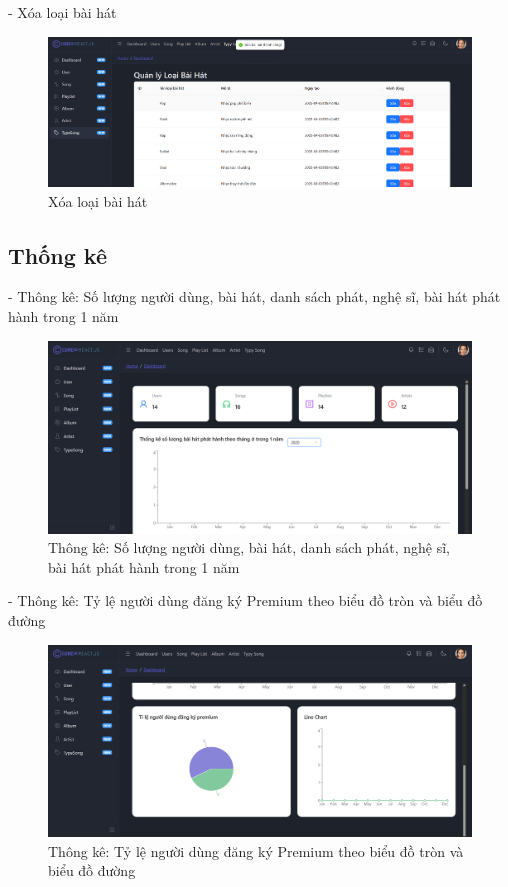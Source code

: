 - Xóa loại bài hát
\begin{figure}[H]
    \centering
    \includegraphics[width=1\textwidth]{imgs/chap5/ql_loai_bai_hat_4.png}
    \caption{Xóa loại bài hát}
\end{figure}

\subsection{Thống kê}
- Thông kê: Số lượng người dùng, bài hát, danh sách phát, nghệ sĩ, bài hát phát hành trong 1 năm
\begin{figure}[H]
    \centering
    \includegraphics[width=1\textwidth]{imgs/chap5/thongke_1.png}
    \caption{Thông kê: Số lượng người dùng, bài hát, danh sách phát, nghệ sĩ, bài hát phát hành trong 1 năm}
\end{figure}

- Thông kê: Tỷ lệ người dùng đăng ký Premium theo biểu đồ tròn và biểu đồ đường
\begin{figure}[H]
    \centering
    \includegraphics[width=1\textwidth]{imgs/chap5/thongke_2.png}
    \caption{Thông kê: Tỷ lệ người dùng đăng ký Premium theo biểu đồ tròn và biểu đồ đường}
\end{figure}